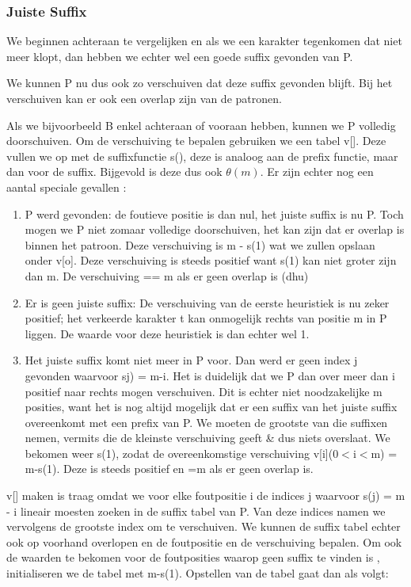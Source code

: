 \subsubsection{Juiste Suffix}
We beginnen achteraan te vergelijken en als we een karakter tegenkomen dat niet meer klopt, dan hebben we echter wel een goede suffix gevonden van P.

We kunnen P nu dus ook zo verschuiven dat deze suffix gevonden blijft.
\clearpage
{}
Bij het verschuiven kan er ook een overlap zijn van de patronen.

Als we bijvoorbeeld B enkel achteraan of vooraan hebben, kunnen we P volledig doorschuiven.
\npar
Om de verschuiving te bepalen gebruiken we een tabel v[]. Deze vullen we op met de suffixfunctie s(), deze is analoog aan de prefix functie, maar dan voor de suffix. Bijgevold is deze dus ook $\theta(m)$.
\npar
Er zijn echter nog een aantal speciale gevallen :
\begin{enumerate}
\item P werd gevonden: de foutieve positie is dan nul, het juiste suffix is nu P. Toch mogen we P niet zomaar volledige doorschuiven, het kan zijn dat er overlap is binnen het patroon. Deze verschuiving is m - s(1) wat we zullen opslaan onder v[o]. Deze verschuiving is steeds positief want s(1) kan niet groter zijn dan m. De verschuiving == m als er geen overlap is (dhu)
\item Er is geen juiste suffix: De verschuiving van de eerste heuristiek is nu zeker positief; het verkeerde karakter t kan onmogelijk rechts van positie m in P liggen. De waarde voor deze heuristiek is dan echter wel 1.
\item Het juiste suffix komt niet meer in P voor. Dan werd er geen index j gevonden waarvoor sj) = m-i. Het is duidelijk dat we P dan over meer dan i positief naar rechts mogen verschuiven. Dit is echter niet noodzakelijke m posities, want het is nog altijd mogelijk dat er een suffix van het juiste suffix overeenkomt met een prefix van P. We moeten de grootste van die suffixen nemen, vermits die de kleinste verschuiving geeft \& dus niets overslaat. We bekomen weer s(1), zodat de overeenkomstige verschuiving v[i](0$<$i$<$m)  = m-s(1). Deze is steeds positief en =m als er geen overlap is.
\end{enumerate}
\npar
v[] maken is traag omdat we voor elke foutpositie i de indices j waarvoor s(j) = m - i lineair moesten zoeken in de suffix tabel van P. Van deze indices namen we vervolgens de grootste index om te verschuiven. We kunnen de suffix tabel echter ook op voorhand overlopen en de foutpositie en de verschuiving bepalen. Om ook de waarden te bekomen voor de foutposities waarop geen suffix te vinden is , initialiseren we de tabel met m-s(1). Opstellen van de tabel gaat dan als volgt:
